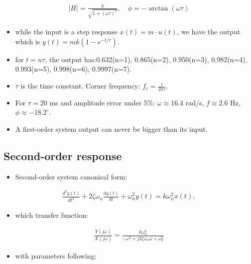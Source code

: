 \documentclass[10pt,a4paper]{ctexart}
\newcommand{\formula}[1]{%
  \par\vspace{1pt}%
  \begingroup
  \setlength{\abovedisplayskip}{0pt}%
  \setlength{\belowdisplayskip}{0pt}%
  \[
    #1
  \]
  \endgroup
  \vspace{1pt}%
}
\begin{document}
\begin{multicols*}{3}
\formula{\displaystyle
  \begin{aligned}
    |H|=\frac{k}{\sqrt{1+(\omega\tau)^2}}, \quad
    \phi=-\arctan(\omega\tau)
  \end{aligned}}

\begin{itemize}
    \item while the input is a step response $x(t)=m\cdot u(t)$, we have the output which is $y(t)=mk(1-e^{-t/\tau})$.
    \item for $t=n\tau$, the output has:0.632(n=1), 0.865(n=2), 0.950(n=3), 0.982(n=4), 0.993(n=5), 0.998(n=6), 0.9997(n=7).
\end{itemize}

\begin{itemize}
  \item $\tau$ is the time constant. Corner frequency:
  $f_c=\frac{1}{2\pi\tau}$.
  \item For $\tau=20$ ms and amplitude error under 5\%:
  $\omega\approx16.4$ rad/s, $f\approx2.6$ Hz, $\phi\approx-18.2^\circ$.
  \item A first-order system output can never be bigger than its input.
\end{itemize}

\subsection{Second-order response}
\begin{itemize}
    \item Second-order system canonical form:
\end{itemize}

\formula{\displaystyle
\begin{aligned}
\frac{d^2y(t)}{dt^2}+2\zeta\omega_n\frac{dy(t)}{dt}+\omega_n^2y(t)=k\omega_n^2x(t),
\end{aligned}}

\begin{itemize}
    \item which transfer function:  
\end{itemize}

\formula{\displaystyle
\begin{aligned}
\frac{Y(j\omega)}{X(j\omega)}=\frac{k\omega_n^2}{-\omega^2+j2\zeta\omega_n\omega+\omega_n^2}
\end{aligned}}

\begin{itemize}
    \item with parameters following:
\end{itemize}


\end{multicols*}
\end{document}
